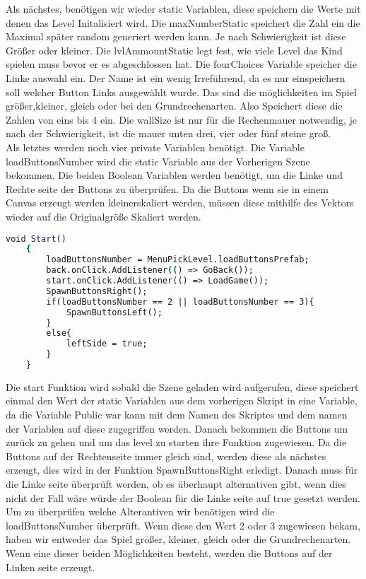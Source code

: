 Als nächstes, benötigen wir wieder static Variablen, diese speichern die Werte mit denen das Level Initalisiert wird. Die maxNumberStatic speichert die Zahl ein die Maximal später random generiert werden kann. Je nach Schwierigkeit ist diese Größer oder kleiner. Die lvlAmmountStatic legt fest, wie viele Level das Kind spielen muss bevor er es abgeschlossen hat. Die fourChoices Variable speicher die Linke auswahl ein. Der Name ist ein wenig Irreführend, da es nur einspeichern soll welcher Button Links ausgewählt wurde. Das sind die möglichkeiten im Spiel größer,kleiner, gleich oder bei den Grundrechenarten. Also Speichert diese die Zahlen von eins bis 4 ein. Die wallSize ist nur für die Rechenmauer notwendig, je nach der Schwierigkeit, ist die mauer unten drei, vier oder fünf steine groß.\\
Als letztes werden noch vier private Variablen benötigt. Die Variable loadButtonsNumber wird die static Variable aus der Vorherigen Szene bekommen. Die beiden Boolean Variablen werden benötigt, um die Linke und Rechte seite der Buttons zu überprüfen. Da die Buttons wenn sie in einem Canvas erzeugt werden kleinerskaliert werden, müssen diese mithilfe des Vektors wieder auf die Originalgröße Skaliert werden.\\
\begin{lstlisting}[language=csh, caption={MenuPickLevelAdvanced.cs Start Funktion}]
	void Start()
	{
		loadButtonsNumber = MenuPickLevel.loadButtonsPrefab;
		back.onClick.AddListener(() => GoBack());
		start.onClick.AddListener(() => LoadGame());
		SpawnButtonsRight();
		if(loadButtonsNumber == 2 || loadButtonsNumber == 3){
			SpawnButtonsLeft();
		}
		else{
			leftSide = true;
		}
	}
\end{lstlisting}
Die start Funktion wird sobald die Szene geladen wird aufgerufen, diese speichert einmal den Wert der static Variablen aus dem vorherigen Skript in eine Variable, da die Variable Public war kann mit dem Namen des Skriptes und dem namen der Variablen auf diese zugegriffen werden.
Danach bekommen die Buttons um zurück zu gehen und um das level zu starten ihre Funktion zugewiesen. Da die Buttons auf der Rechtenseite immer gleich sind, werden diese als nächstes erzeugt, dies wird in der Funktion SpawnButtonsRight erledigt. Danach muss für die Linke seite überprüft werden, ob es überhaupt alternativen gibt, wenn dies nicht der Fall wäre würde der Boolean für die Linke seite auf true gesetzt werden. Um zu überprüfen welche Alterantiven wir benötigen wird die loadButtonsNumber überprüft. Wenn diese den Wert 2 oder 3 zugewiesen bekam, haben wir entweder das Spiel größer, kleiner, gleich oder die Grundrechenarten. Wenn eine dieser beiden Möglichkeiten besteht, werden die Buttons auf der Linken seite erzeugt.\\
